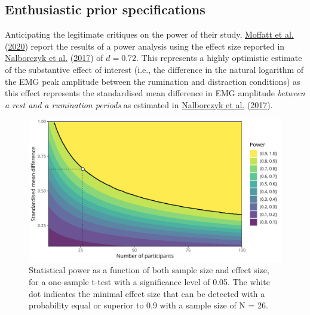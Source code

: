 \documentclass[
  english,
  man, donotrepeattitle,mask,floatsintext]{apa6}
\begin{document}
\hypertarget{enthusiastic-prior-specifications}{%
\subsection{Enthusiastic prior specifications}\label{enthusiastic-prior-specifications}}

Anticipating the legitimate critiques on the power of their study, \protect\hyperlink{ref-moffatt_inner_2020}{Moffatt et al.} (\protect\hyperlink{ref-moffatt_inner_2020}{2020}) report the results of a power analysis using the effect size reported in \protect\hyperlink{ref-nalborczyk_orofacial_2017}{Nalborczyk et al.} (\protect\hyperlink{ref-nalborczyk_orofacial_2017}{2017}) of \(d = 0.72\). This represents a highly optimistic estimate of the substantive effect of interest (i.e., the difference in the natural logarithm of the EMG peak amplitude between the rumination and distraction conditions) as this effect represents the standardised mean difference in EMG amplitude \emph{between a rest and a rumination periods} as estimated in \protect\hyperlink{ref-nalborczyk_orofacial_2017}{Nalborczyk et al.} (\protect\hyperlink{ref-nalborczyk_orofacial_2017}{2017}).

\begin{figure}[!htb]

{\centering \includegraphics[width=1\linewidth]{manuscript_files/figure-latex/power-1} 

}

\caption{Statistical power as a function of both sample size and effect size, for a one-sample t-test with a significance level of 0.05. The white dot indicates the minimal effect size that can be detected with a probability equal or superior to 0.9 with a sample size of N = 26.}\label{fig:power}
\end{figure}
\end{document}
